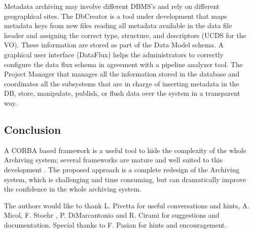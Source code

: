 
Metadata archiving may involve different DBMS's and rely on different geographical sites.
The DbCreator is a tool under development that maps metadata keys from new files reading
all metadata available in the data file header and assigning the correct type, structure,
and descriptors (UCDS for the VO). These information are stored as part of the Data Model schema.
A graphical user interface (DataFlux) helps the administrators to correctly configure the
data flux schema in agreement with a pipeline analyzer tool. The Project Manager that
manages all the information stored in the database and
coordinates all the subsystems that are in charge of inserting metadata in the DB, store,
manipulate, publish, or flush data over the system in a transparent way.

\subsection{Conclusion}
A CORBA based framework is a useful tool to hide the complexity of the whole Archiving system; several frameworks are mature and well suited to this development . The proposed approach is a complete redesign of the Archiving system, which is challenging and time consuming, but can dramatically improve the confidence in the whole archiving system.

\acknowledgements The authors would like to thank L. Pivetta for useful conversations and hints, A. Micol, F. Stoehr , P. DiMarcantonio and R. Cirami for suggestions and documentation. Special thanks to F. Pasian for hints and encouragement.
